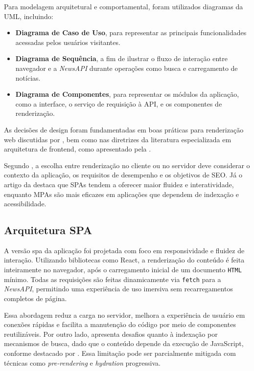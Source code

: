 Para modelagem arquitetural e comportamental, foram utilizados diagramas da UML, incluindo:
\begin{itemize}
  \item \textbf{Diagrama de Caso de Uso}, para representar as principais funcionalidades acessadas pelos usuários visitantes.
  \item \textbf{Diagrama de Sequência}, a fim de ilustrar o fluxo de interação entre navegador e a \textit{NewsAPI} durante operações como busca e carregamento de notícias.
  \item \textbf{Diagrama de Componentes}, para representar os módulos da aplicação, como a interface, o serviço de requisição à API, e os componentes de renderização.
\end{itemize}

As decisões de design foram fundamentadas em boas práticas para renderização web discutidas por \cite{osmani2025}, bem como nas diretrizes da literatura especializada em arquitetura de frontend, como apresentado pela \cite{atori2024}.

Segundo \cite{osmani2025}, a escolha entre renderização no cliente ou no servidor deve considerar o contexto da aplicação, os requisitos de desempenho e os objetivos de SEO. Já o artigo da \cite{atori2024} destaca que SPAs tendem a oferecer maior fluidez e interatividade, enquanto MPAs são mais eficazes em aplicações que dependem de indexação e acessibilidade.

\subsection{Arquitetura SPA}

A versão \acrshort{spa} da aplicação foi projetada com foco em responsividade e fluidez de interação. Utilizando bibliotecas como React, a renderização do conteúdo é feita inteiramente no navegador, após o carregamento inicial de um documento \texttt{HTML} mínimo. Todas as requisições são feitas dinamicamente via \texttt{fetch} para a \textit{NewsAPI}, permitindo uma experiência de uso imersiva sem recarregamentos completos de página.

Essa abordagem reduz a carga no servidor, melhora a experiência de usuário em conexões rápidas e facilita a manutenção do código por meio de componentes reutilizáveis. Por outro lado, apresenta desafios quanto à indexação por mecanismos de busca, dado que o conteúdo depende da execução de JavaScript, conforme destacado por \cite{osmani2025}. Essa limitação pode ser parcialmente mitigada com técnicas como \textit{pre-rendering} e \textit{hydration} progressiva.

